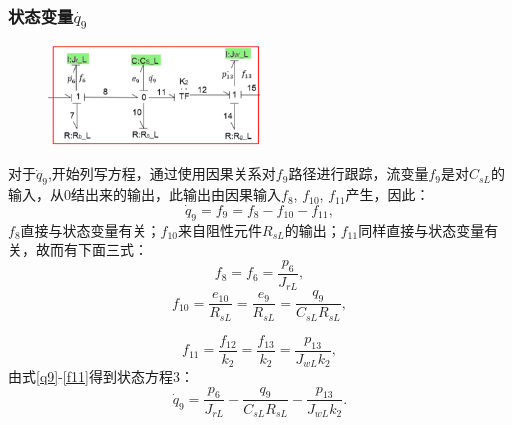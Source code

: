 \subsubsection{状态变量$\dot{ q_9 }$}
\begin{figure}[h]
	\centering
	\includegraphics[width=0.5\textwidth]{fig/equation3.png}
	\caption{}\label{fig:equation3}
\end{figure}
对于$\dot{q} _ { 9 }$,开始列写方程，通过使用因果关系对$f_9$路径进行跟踪，流变量$f_9$是对$C_{sL}$的输入，从0结出来的输出，此输出由因果输入$f _ { 8 }$, $ f _ { 10 }$, $  f _ { 11 }$产生，因此：
\begin{equation}\label{q9}
\dot{ q }_{ 9 } = f _ { 9 } = f _ { 8 } - f _ { 10 } - f _ { 11 },
\end{equation}
$f_8$直接与状态变量有关；$f_{10}$来自阻性元件$R _ { sL }$的输出；$f_{11}$同样直接与状态变量有关，故而有下面三式：
\begin{equation}
f _ { 8 } = f _ { 6 } = \frac { p _ { 6 } } { J _ { r L } },
\end{equation}
\begin{equation}
f _ { 10 } = \frac { e _ { 10 } } { R _ { sL}  } = \frac { e _ { 9 } } { R _ { sL }  } = \frac { q _ { 9 } } { C _ { s L}  R _ { s  L } } ,
\end{equation}

\begin{equation}\label{f11}
f _ { 11 } = \frac { f _ { 12 } } { k _ { 2 } } = \frac { f _ { 13 } } { k _ { 2 } } = \frac { p _ { 13 } } { J _ { wL}  k _ { 2 } },
\end{equation}
由式\ref{q9}-\ref{f11}得到状态方程3：
\begin{equation}
\dot{ q } _ { 9 } = \frac { p _ { 6 } } { J _ { rL } } - \frac { q _ { 9 } } { C _ { sL }  R _ { s L}  } - \frac { p _ { 13 } } { J _ { w L }  k _ { 2 } }.
\end{equation}
